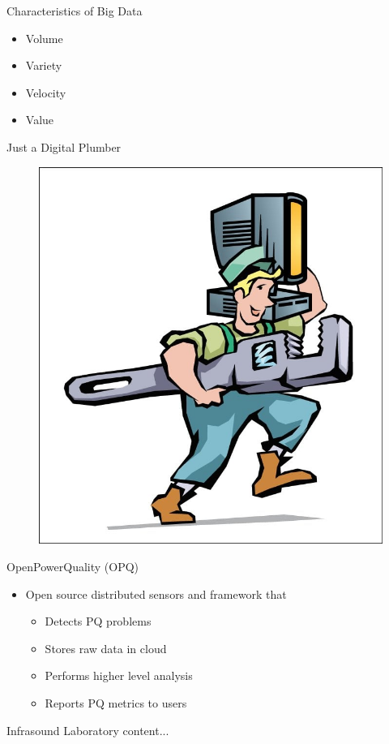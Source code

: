 \documentclass{beamer}
\begin{document}
\begin{frame}{Characteristics of Big Data}
\begin{itemize}
	\item Volume
	\item Variety
	\item Velocity
	\item Value
\end{itemize}
\end{frame}

\begin{frame}{Just a Digital Plumber}
\begin{figure}
	\includegraphics[width=.65\linewidth]{img/digitalplumber.jpg}
\end{figure}
\end{frame}

\begin{frame}{OpenPowerQuality (OPQ)}
\begin{itemize}
	\item Open source distributed sensors and framework that
	\begin{itemize}
		\item Detects PQ problems
		\item Stores raw data in cloud
		\item Performs higher level analysis
		\item Reports PQ metrics to users
	\end{itemize}
\end{itemize}
\end{frame}

\begin{frame}{Infrasound Laboratory}
content...
\end{frame}
\end{document}
